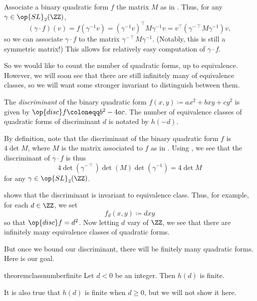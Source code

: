 \documentclass[../notes.tex]{subfiles}
\begin{document}
\begin{remark} \label{rem:matrix-of-equiv-form}
	Associate a binary quadratic form $f$ the matrix $M$ as in . Thus, for any $\gamma\in\op{SL}_2(\ZZ)$,
	\[(\gamma\cdot f)(v)=f\left(\gamma^{-1}v\right)=\left(\gamma^{-1}v\right)^\intercal M\gamma^{-1}v=v^\intercal\left(\gamma^{-\intercal}M\gamma^{-1}\right)v,\]
	so we can associate $\gamma\cdot f$ to the matrix $\gamma^{-\intercal}M\gamma^{-1}$. (Notably, this is still a symmetric matrix!) This allows for relatively easy computation of $\gamma\cdot f$.
\end{remark}
So we would like to count the number of quadratic forms, up to equivalence. However, we will soon see that there are still infinitely many of equivalence classes, so we will want some stronger invariant to distinguish between them.
\begin{definition}[discriminant]
	The \textit{discriminant} of the binary quadratic form $f(x,y)\coloneqq ax^2+bxy+cy^2$ is given by $\op{disc}f\coloneqq b^2-4ac$. The number of equivalence classes of quadratic forms of discriminant $d$ is notated by $h(-d)$.
\end{definition}
\begin{remark} \label{rem:disc-on-equiv-class}
	By definition, note that the discriminant of the binary quadratic form $f$ is $4\det M$, where $M$ is the matrix associated to $f$ as in . Using , we see that the discriminant of $\gamma\cdot f$ is thus
	\[4\det\left(\gamma^{-\intercal}\right)\det(M)\det\left(\gamma^{-1}\right)=4\det M\]
	for any $\gamma\in\op{SL}_2(\ZZ)$.
\end{remark}
 shows that the discriminant is invariant to equivalence class. Thus, for example, for each $d\in\ZZ$, we set
\[f_d(x,y)\coloneqq dxy\]
so that $\op{disc}f=d^2$. Now letting $d$ vary of $\ZZ$, we see that there are infinitely many equivalence classes of quadratic forms.

But once we bound our discriminant, there will be finitely many quadratic forms. Here is our goal.
\begin{restatable}{theorem}{classnumberfinite} \label{thm:class-number-finite}
	Let $d<0$ be an integer. Then $h(d)$ is finite.
\end{restatable}
\begin{remark}
	It is also true that $h(d)$ is finite when $d\ge0$, but we will not show it here.
\end{remark}
\end{document}
